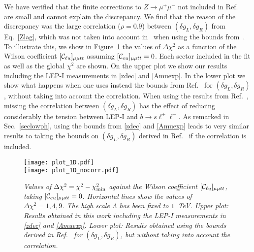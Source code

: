 \documentclass[aps,twocolumn,showpacs,preprintnumbers,amsmath,amssymb,floatfix,nofootinbib]{revtex4-1}
\newcommand{\C}{{\cal C}}
\begin{document}
We have verified that the finite corrections to ${Z \to \mu^+ \mu^-}$ not included in Ref.~\cite{Celis:2017doq} are small and cannot explain the discrepancy. We find that the reason of the discrepancy was the large correlation ($\rho = 0.9$) between $(\delta g_L,\delta g_R)$ from Eq.~\eqref{Zlag}, which was not taken into account in~\cite{Celis:2017doq} when using the bounds from~\cite{Efrati:2015eaa}.   To illustrate this, we show in Figure~\ref{figplots2} the values of $\Delta \chi^2$ as a function of the Wilson coefficient $[\C_{\ell u}]_{\mu \mu tt}$ assuming $[\C_{e u}]_{\mu \mu tt}=0$.   Each sector included in the fit as well as the global $\chi^2$ are shown.         On the upper plot we show our results including the LEP-I measurements in \eqref{zdec} and \eqref{Amuexp}.   In the lower plot we show what happens when one uses instead the bounds from Ref.~\cite{Efrati:2015eaa} for $(\delta g_L,\delta g_R)$, without taking into account the correlation.   When using the results from Ref.~\cite{Efrati:2015eaa}, missing the correlation between $(\delta g_L,\delta g_R)$ has the effect of reducing considerably the tension between LEP-I and $b \to s \ell^+ \ell^-$.     As remarked in Sec.~\ref{seclowph}, using the bounds from \eqref{zdec} and \eqref{Amuexp} leads to very similar results to taking the bounds on $(\delta g_L,\delta g_R)$ derived in Ref.~\cite{Efrati:2015eaa} if the correlation is included.

%
\begin{figure}[htp]
\begin{center}{
\texttt{[image: plot\_1D.pdf]}\\
\texttt{[image: plot\_1D\_nocorr.pdf]}
\caption{\textit{Values of $\Delta \chi^2 = \chi^2 - \chi^2_{\rm{min}}$ against the Wilson coefficient $[\C_{\ell u}]_{\mu \mu tt}$, taking $[\C_{eu}]_{\mu \mu tt}=0$.   Horizontal lines show the values of $\Delta \chi^2=1,4,9$.   The high scale $\Lambda$ has been fixed to $1$~TeV.   Upper plot:     Results obtained in this work including the LEP-I measurements in \eqref{zdec} and \eqref{Amuexp}.   Lower plot:   Results obtained using the bounds derived in Ref.~\cite{Efrati:2015eaa} for $(\delta g_L,\delta g_R)$, but without taking into account the correlation. } \label{figplots2}     } }
\end{center}
\end{figure}
\end{document}
